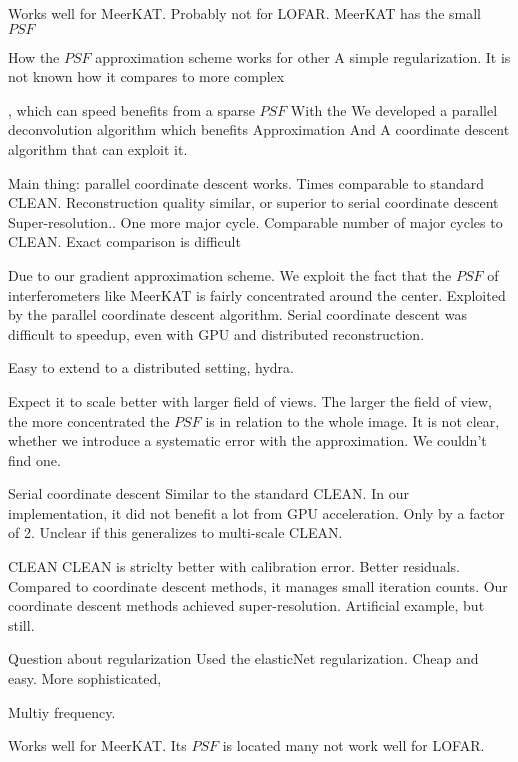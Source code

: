 Works well for MeerKAT. Probably not for LOFAR. MeerKAT has the small $PSF$










How the $PSF$ approximation scheme works for other 
A simple regularization. It is not known how it compares to more complex 


 , which can speed benefits from a sparse $PSF$ With the  We developed a parallel deconvolution algorithm which benefits
Approximation
And A coordinate descent algorithm that can  exploit it.

Main thing: parallel coordinate descent works.
Times comparable to standard CLEAN.
Reconstruction quality similar, or superior to serial coordinate descent
Super-resolution..
One more major cycle.
Comparable number of major cycles to CLEAN. Exact comparison is difficult

Due to our gradient approximation scheme. We exploit the fact that the $PSF$ of interferometers like MeerKAT is fairly concentrated around the center.
Exploited by the parallel coordinate descent algorithm. 
Serial coordinate descent was difficult to speedup, even with GPU and distributed reconstruction.

Easy to extend to a distributed setting, hydra.

Expect it to scale better with larger field of views. The larger the field of view, the more concentrated the $PSF$ is in relation to the whole image.
It is not clear, whether we introduce a systematic error with the approximation. We couldn't find one.

Serial coordinate descent
Similar to the standard CLEAN.
In our implementation, it did not benefit a lot from GPU acceleration. Only by a factor of 2. Unclear if this generalizes to multi-scale CLEAN.

CLEAN
CLEAN is striclty better with calibration error.
Better residuals. Compared to coordinate descent methods, it manages small iteration counts.
Our coordinate descent methods achieved super-resolution. Artificial example, but still.

Question about regularization
Used the elasticNet regularization. Cheap and easy. More sophisticated, 

Multiy frequency.






Works well for MeerKAT. Its $PSF$ is located many not work well for LOFAR.

